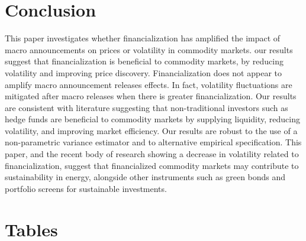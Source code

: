 \documentclass[12pt]{article}
\begin{document}
\section{Conclusion} \label{sec:conclusion}
 This paper investigates whether financialization has amplified the impact of macro announcements on prices or volatility in commodity markets. our results suggest that financialization is beneficial to commodity markets, by reducing volatility and improving price discovery. Financialization does not appear to amplify macro announcement releases effects. In fact, volatility fluctuations are mitigated after macro releases when there is greater financialization. Our results are consistent with literature suggesting that non-traditional investors such as hedge funds are beneficial to commodity markets by supplying liquidity, reducing volatility, and improving market efficiency. Our results are robust to the use of a non-parametric variance estimator and to alternative empirical specification.
This paper, and the recent body of research showing a decrease in volatility related to financialization, suggest that financialized commodity markets may contribute to sustainability in energy, alongside other instruments such as green bonds and portfolio screens for sustainable investments.

\newpage

\section{Tables}

\end{document}
